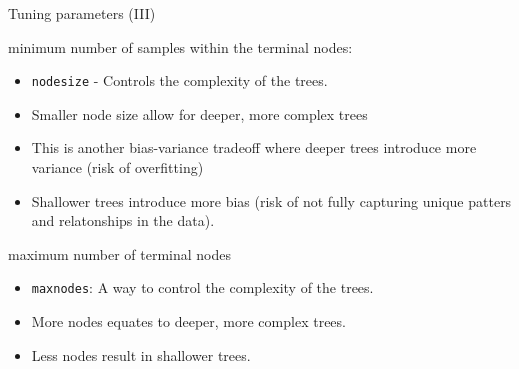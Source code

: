 \documentclass[
  10pt,
  ignorenonframetext,
]{beamer}
\providecommand{\tightlist}{%
  \setlength{\itemsep}{0pt}\setlength{\parskip}{0pt}}
\begin{document}
\begin{frame}[fragile]{Tuning parameters (III)}
\protect\hypertarget{tuning-parameters-iii}{}

\begin{block}{minimum number of samples within the terminal nodes:}

\begin{itemize}
\tightlist
\item
  \texttt{nodesize} - Controls the complexity of the trees.
\item
  Smaller node size allow for deeper, more complex trees
\item
  This is another bias-variance tradeoff where deeper trees introduce
  more variance (risk of overfitting)
\item
  Shallower trees introduce more bias (risk of not fully capturing
  unique patters and relatonships in the data).
\end{itemize}

\end{block}

\begin{block}{maximum number of terminal nodes}

\begin{itemize}
\tightlist
\item
  \texttt{maxnodes}: A way to control the complexity of the trees.
\item
  More nodes equates to deeper, more complex trees.
\item
  Less nodes result in shallower trees.
\end{itemize}

\end{block}

\end{frame}
\end{document}
